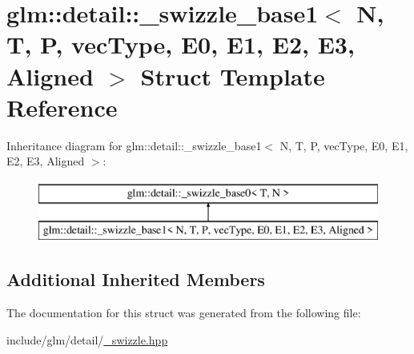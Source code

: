 \hypertarget{structglm_1_1detail_1_1__swizzle__base1}{}\section{glm\+:\+:detail\+:\+:\+\_\+swizzle\+\_\+base1$<$ N, T, P, vec\+Type, E0, E1, E2, E3, Aligned $>$ Struct Template Reference}
\label{structglm_1_1detail_1_1__swizzle__base1}
Inheritance diagram for glm\+:\+:detail\+:\+:\+\_\+swizzle\+\_\+base1$<$ N, T, P, vec\+Type, E0, E1, E2, E3, Aligned $>$\+:\begin{figure}[H]
\begin{center}
\leavevmode
\includegraphics[height=2.000000cm]{structglm_1_1detail_1_1__swizzle__base1}
\end{center}
\end{figure}
\subsection*{Additional Inherited Members}


The documentation for this struct was generated from the following file\+:\begin{DoxyCompactItemize}
\item 
include/glm/detail/\hyperlink{__swizzle_8hpp}{\+\_\+swizzle.\+hpp}\end{DoxyCompactItemize}
